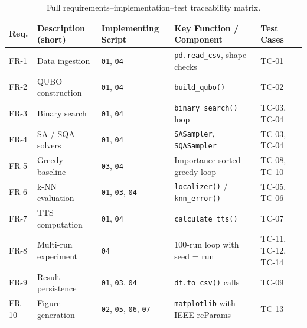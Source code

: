 \documentclass[12pt,a4paper]{article}
\begin{document}
\begin{landscape}
\begin{table}[p]
\centering
\renewcommand{\arraystretch}{1.4}
\small
\begin{tabular}{@{}l p{4.2cm} p{3.8cm} p{3.5cm} l@{}}
\toprule
\textbf{Req.} &
\textbf{Description (short)} &
\textbf{Implementing Script} &
\textbf{Key Function / Component} &
\textbf{Test Cases} \\
\midrule
FR-1  & Data ingestion
      & \texttt{01}, \texttt{04}
      & \texttt{pd.read\_csv}, shape checks
      & TC-01 \\

FR-2  & QUBO construction
      & \texttt{01}, \texttt{04}
      & \texttt{build\_qubo()}
      & TC-02 \\

FR-3  & Binary search
      & \texttt{01}, \texttt{04}
      & \texttt{binary\_search()} loop
      & TC-03, TC-04 \\

FR-4  & SA / SQA solvers
      & \texttt{01}, \texttt{04}
      & \texttt{SASampler}, \texttt{SQASampler}
      & TC-03, TC-04 \\

FR-5  & Greedy baseline
      & \texttt{03}, \texttt{04}
      & Importance-sorted greedy loop
      & TC-08, TC-10 \\

FR-6  & k-NN evaluation
      & \texttt{01}, \texttt{03}, \texttt{04}
      & \texttt{localizer()} / \texttt{knn\_error()}
      & TC-05, TC-06 \\

FR-7  & TTS computation
      & \texttt{01}, \texttt{04}
      & \texttt{calculate\_tts()}
      & TC-07 \\

FR-8  & Multi-run experiment
      & \texttt{04}
      & 100-run loop with seed = run
      & TC-11, TC-12, TC-14 \\

FR-9  & Result persistence
      & \texttt{01}, \texttt{03}, \texttt{04}
      & \texttt{df.to\_csv()} calls
      & TC-09 \\

FR-10 & Figure generation
      & \texttt{02}, \texttt{05}, \texttt{06}, \texttt{07}
      & \texttt{matplotlib} with IEEE rcParams
      & TC-13 \\
\bottomrule
\end{tabular}
\caption{Full requirements--implementation--test traceability matrix.}
\end{table}
\end{landscape}
\end{document}
